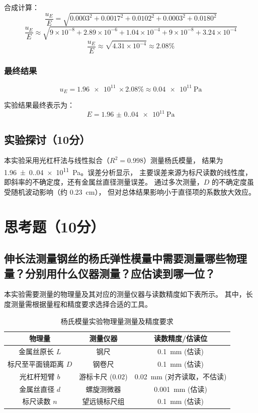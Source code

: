\documentclass{../../templates/Report}%
\begin{document}
\begin{fullreportonly}
    合成计算：
    $$ \frac{u_E}{E} = \sqrt{0.0003^2 + 0.0017^2 + 0.0102^2 + 0.0003^2 + 0.0180^2} $$
    $$ \frac{u_E}{E} \approx \sqrt{9 \times 10^{-8} + 2.89 \times 10^{-6} + 1.04 \times 10^{-4} + 9 \times 10^{-8} + 3.24 \times 10^{-4}} $$
    $$ \frac{u_E}{E} \approx \sqrt{4.31 \times 10^{-4}} \approx 2.08\% $$

    \subsubsection{最终结果}
    $$ u_E = \SI{1.96e11}{} \times 2.08\% \approx \SI{0.04e11}{\pascal} $$

    实验结果最终表示为：
    $$ E = \SI{1.96(0.04)e11}{\pascal}$$

    \subsection{实验探讨（10分）}
    本实验采用光杠杆法与线性拟合（$R^2=0.998$）测量杨氏模量，
    结果为 \SI{1.96(0.04)e11}{\pascal}。误差分析显示，
    主要误差来源为标尺读数的线性度，即斜率的不确定度，还有金属丝直径测量误差。
    通过多次测量，$D$ 的不确定度虽受随机波动影响（约 \SI{0.23}{\centi\meter}），
    但对总体结果影响小于直径项的系数放大效应。
    \section{思考题（10分）}
    \subsection{伸长法测量钢丝的杨氏弹性模量中需要测量哪些物理量？分别用什么仪器测量？应估读到哪一位？}

    本实验需要测量的物理量及其对应的测量仪器与读数精度如下表所示。
    其中，长度测量需根据量程和精度要求选择合适的工具。

    \begin{table}[H]
        \centering
        \caption{杨氏模量实验物理量测量及精度要求}
        \begin{tabular}{ccc}
            \toprule
            物理量          & 测量仪器          & 读数精度/估读位                           \\
            \midrule
            金属丝原长 $L$    & 钢尺            & \SI{0.1}{\milli\meter} (估读)        \\
            标尺至平面镜距离 $D$ & 钢卷尺           & \SI{0.1}{\milli\meter} (估读)        \\
            光杠杆短臂 $b$    & 游标卡尺 ($0.02$) & \SI{0.02}{\milli\meter} (对齐读取，不估读) \\
            金属丝直径 $d$    & 螺旋测微器         & \SI{0.001}{\milli\meter} (估读)      \\
            标尺读数 $n$     & 望远镜标尺组        & \SI{0.1}{\milli\meter} (估读)        \\
            \bottomrule
        \end{tabular}
    \end{table}


\end{fullreportonly}
\end{document}

